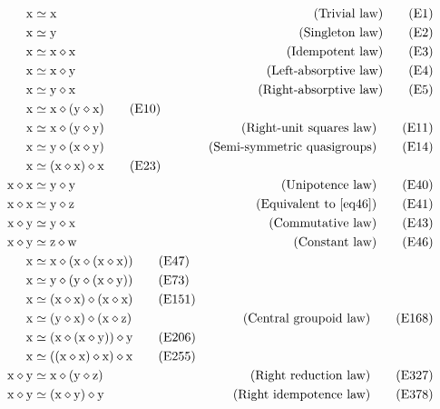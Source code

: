 \documentclass[12pt]{amsart}
\theoremstyle{definition}
\newcommand{\x}{\mathrm{x}}
\newcommand{\y}{\mathrm{y}}
\newcommand{\z}{\mathrm{z}}
\newcommand{\w}{\mathrm{w}}
\newcommand{\op}{\diamond}
\newcommand{\formaleq}{\simeq}
\begin{document}
\begin{align}
    \x &\formaleq \x & \hbox{(Trivial law)} \label{eq1}\tag{E1} \\
    \x &\formaleq \y & \hbox{(Singleton law)} \label{eq2}\tag{E2} \\
    \x &\formaleq \x \op \x & \hbox{(Idempotent law)} \label{eq3}\tag{E3} \\
    \x &\formaleq \x \op \y & \hbox{(Left-absorptive law)} \label{eq4}\tag{E4} \\
    \x &\formaleq \y \op \x & \hbox{(Right-absorptive law)} \label{eq5}\tag{E5} \\
    \x &\formaleq \x \op (\y \op \x) \label{eq10}\tag{E10} \\
    \x &\formaleq \x \op (\y \op \y) & \hbox{(Right-unit squares law)} \label{eq11}\tag{E11} \\
    \x &\formaleq \y \op (\x \op \y) & \hbox{(Semi-symmetric quasigroups)} \label{eq14}\tag{E14} \\
    \x &\formaleq (\x \op \x) \op \x \label{eq23}\tag{E23} \\
    \x \op \x &\formaleq \y \op \y & \hbox{(Unipotence law)} \label{eq40}\tag{E40} \\
    \x \op \x &\formaleq \y \op \z & \hbox{(Equivalent to~\eqref{eq46})} \label{eq41}\tag{E41} \\
    \x \op \y &\formaleq \y \op \x & \hbox{(Commutative law)} \label{eq43}\tag{E43} \\
    \x \op \y &\formaleq \z \op \w & \hbox{(Constant law)} \label{eq46}\tag{E46} \\
    \x &\formaleq \x \op (\x \op (\x \op \x)) \label{eq47}\tag{E47} \\
    \x &\formaleq \y \op (\y \op (\x \op \y))  \label{eq73}\tag{E73} \\
    \x &\formaleq (\x \op \x) \op (\x \op \x) \label{eq151}\tag{E151} \\
    \x &\formaleq (\y \op \x) \op (\x \op \z) & \hbox{(Central groupoid law)} \label{eq168}\tag{E168} \\
    \x &\formaleq (\x \op (\x \op \y)) \op \y \label{eq206}\tag{E206} \\
    \x &\formaleq ((\x \op \x) \op \x) \op \x \label{eq255}\tag{E255} \\
    \x \op \y &\formaleq \x \op (\y \op \z) & \hbox{(Right reduction law)} \label{eq327}\tag{E327} \\
    \x \op \y &\formaleq (\x \op \y) \op \y & \hbox{(Right idempotence law)} \label{eq378}\tag{E378} \\

\end{align}
\end{document}
